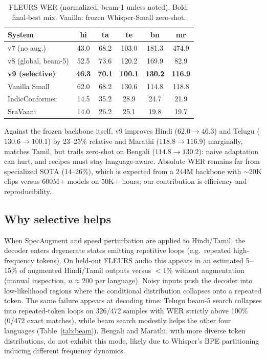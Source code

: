 \documentclass[9pt,a4paper,twocolumn]{article}
\begin{document}
\begin{table}[t]
  \centering
  \caption{FLEURS WER (normalized, beam-1 unless noted). Bold: final-best mix. Vanilla: frozen Whisper-Small zero-shot.}
  \label{tab:main}
  \footnotesize
  \setlength{\tabcolsep}{3pt}
  \begin{tabular}{lccccc}
    \toprule
    System & hi & ta & te & bn & mr \\
    \midrule
    v7 (no aug.) & 43.0 & 68.2 & 103.0 & 181.3 & 474.9 \\
    v8 (global, beam-5) & 52.5 & 73.6 & 120.2 & 169.9 & 82.9 \\
    \textbf{v9 (selective)} & \textbf{46.3} & \textbf{70.1} & \textbf{100.1} & \textbf{130.2} & \textbf{116.9} \\
    \midrule
    Vanilla Small & 62.0 & 68.2 & 130.6 & 114.8 & 118.8 \\
    \midrule
    IndicConformer & 14.5 & 35.2 & 28.9 & 24.7 & 21.9 \\
    SraVaani & 14.0 & 26.2 & 25.1 & 19.8 & 19.7 \\
    \bottomrule
  \end{tabular}
\end{table}

Against the frozen backbone itself, v9 improves Hindi ($62.0\to46.3$) and Telugu ($130.6\to100.1$) by 23--25\% relative and Marathi ($118.8\to116.9$) marginally, matches Tamil, but trails zero-shot on Bengali ($114.8\to130.2$): naive adaptation can hurt, and recipes must stay language-aware. Absolute WER remains far from specialized SOTA (14--26\%), which is expected from a 244M backbone with $\sim$20K clips versus 600M+ models on 50K+ hours; our contribution is efficiency and reproducibility.

\subsection{Why selective helps}
When SpecAugment and speed perturbation are applied to Hindi/Tamil, the decoder enters degenerate states emitting repetitive loops (e.g.\ repeated high-frequency tokens). On held-out FLEURS audio this appears in an estimated 5--15\% of augmented Hindi/Tamil outputs versus $<1$\% without augmentation (manual inspection, $n\approx200$ per language). Noisy inputs push the decoder into low-likelihood regions where the conditional distribution collapses onto a repeated token. The same failure appears at decoding time: Telugu beam-5 search collapses into repeated-token loops on 326/472 samples with WER strictly above 100\% (0/472 exact matches), while beam search modestly helps the other four languages (Table~\ref{tab:beam}). Bengali and Marathi, with more diverse token distributions, do not exhibit this mode, likely due to Whisper's BPE partitioning inducing different frequency dynamics.
\end{document}
